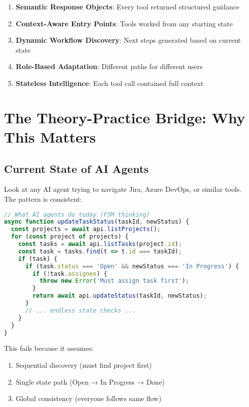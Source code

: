 \documentclass[11pt,a4paper]{article}
\begin{document}
\begin{enumerate}
\item \textbf{Semantic Response Objects}: Every tool returned structured guidance
\item \textbf{Context-Aware Entry Points}: Tools worked from any starting state
\item \textbf{Dynamic Workflow Discovery}: Next steps generated based on current state
\item \textbf{Role-Based Adaptation}: Different paths for different users
\item \textbf{Stateless Intelligence}: Each tool call contained full context
\end{enumerate}

\section{The Theory-Practice Bridge: Why This Matters}

\subsection{Current State of AI Agents}

Look at any AI agent trying to navigate Jira, Azure DevOps, or similar tools. The pattern is consistent:

\begin{lstlisting}[language=JavaScript]
// What AI agents do today (FSM thinking)
async function updateTaskStatus(taskId, newStatus) {
  const projects = await api.listProjects();
  for (const project of projects) {
    const tasks = await api.listTasks(project.id);
    const task = tasks.find(t => t.id === taskId);
    if (task) {
      if (task.status === 'Open' && newStatus === 'In Progress') {
        if (!task.assignee) {
          throw new Error('Must assign task first');
        }
        return await api.updateStatus(taskId, newStatus);
      }
      // ... endless state checks ...
    }
  }
}
\end{lstlisting}

This fails because it assumes:
\begin{enumerate}
\item Sequential discovery (must find project first)
\item Single state path (Open → In Progress → Done)
\item Global consistency (everyone follows same flow)
\end{enumerate}
\end{document}
